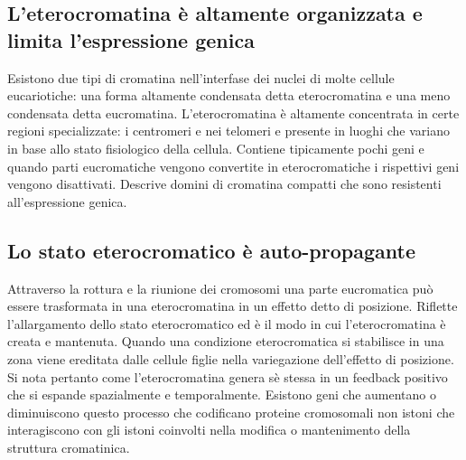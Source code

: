 \subsection{L'eterocromatina \`e altamente organizzata e limita l'espressione genica}
Esistono due tipi di cromatina nell'interfase dei nuclei di molte cellule eucariotiche: una forma altamente condensata detta eterocromatina e una meno condensata detta eucromatina. 
L'eterocromatina \`e altamente concentrata in certe regioni specializzate: i centromeri e nei telomeri e presente in luoghi che variano in base allo stato fisiologico della cellula. 
Contiene tipicamente pochi geni e quando parti eucromatiche vengono convertite in eterocromatiche i rispettivi geni vengono disattivati. Descrive domini di cromatina compatti che sono
resistenti all'espressione genica.
\subsection{Lo stato eterocromatico \`e auto-propagante}
Attraverso la rottura e la riunione dei cromosomi una parte eucromatica pu\`o essere trasformata in una eterocromatina in un effetto detto di posizione. Riflette l'allargamento dello 
stato eterocromatico ed \`e il modo in cui l'eterocromatina \`e creata e mantenuta. Quando una condizione eterocromatica si stabilisce in una zona viene ereditata dalle cellule figlie
nella variegazione dell'effetto di posizione. Si nota pertanto come l'eterocromatina genera s\`e stessa in un feedback positivo che si espande spazialmente e temporalmente. Esistono 
geni che aumentano o diminuiscono questo processo che codificano proteine cromosomali non istoni che interagiscono con gli istoni coinvolti nella modifica o mantenimento della struttura
cromatinica.
